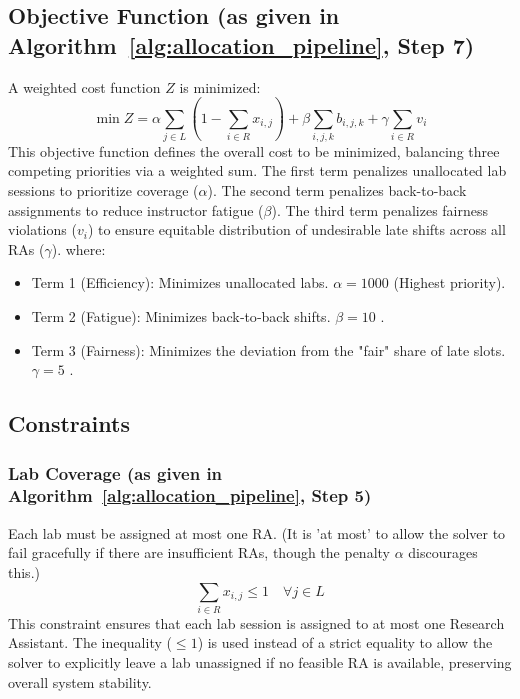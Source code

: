 \documentclass[journal,onecolumn]{IEEEtran}
\begin{document}
\subsection{Objective Function (as given in Algorithm~\ref{alg:allocation_pipeline}, Step 7)}
A weighted cost function $Z$ is minimized:
\begin{equation}
\min Z = \alpha \sum_{j \in L} \left(1 - \sum_{i \in R} x_{i,j}\right) + \beta \sum_{i,j,k} b_{i,j,k} + \gamma \sum_{i \in R} v_i
\label{eq:objective}
\end{equation}
This objective function defines the overall cost to be minimized, balancing three competing priorities via a weighted sum. The first term penalizes unallocated lab sessions to prioritize coverage ($\alpha$). The second term penalizes back-to-back assignments to reduce instructor fatigue ($\beta$). The third term penalizes fairness violations ($v_i$) to ensure equitable distribution of undesirable late shifts across all RAs ($\gamma$).
where:
\begin{itemize}
    \item Term 1 (Efficiency): Minimizes unallocated labs. $\alpha=1000$ (Highest priority).
    \item Term 2 (Fatigue): Minimizes back‑to‑back shifts. $\beta=10$ \cite{fatigue, anderson2018}.
    \item Term 3 (Fairness): Minimizes the deviation from the "fair" share of late slots. $\gamma=5$ \cite{fair_allocation, fairness_ml}.
\end{itemize}

\subsection{Constraints}

\subsubsection{Lab Coverage (as given in Algorithm~\ref{alg:allocation_pipeline}, Step 5)}
Each lab must be assigned at most one RA. (It is 'at most' to allow the solver to fail gracefully if there are insufficient RAs, though the penalty $\alpha$ discourages this.)
\begin{equation}
\sum_{i \in R} x_{i,j} \leq 1 \quad \forall j \in L
\label{eq:lab_coverage}
\end{equation}
This constraint ensures that each lab session is assigned to at most one Research Assistant. The inequality ($\leq 1$) is used instead of a strict equality to allow the solver to explicitly leave a lab unassigned if no feasible RA is available, preserving overall system stability.
\end{document}
